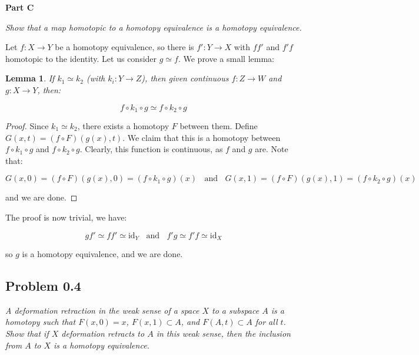 \documentclass[10pt, oneside]{amsart}
\newtheorem{lem}{Lemma}
\begin{document}
    \textbf{Part C}
    \newline

    \textit{Show that a map homotopic to a homotopy equivalence is a homotopy equivalence.}
    \newline

    Let $f : X \rightarrow Y$ be a homotopy equivalence, so there is $f' : Y \rightarrow X$ with $f f'$ and $f' f$ homotopic to the identity. Let us consider $g \simeq f$. We prove a small lemma:

    \begin{lem}
      If $k_1 \simeq k_2$ (with $k_i : Y \rightarrow Z$), then given continuous $f : Z \rightarrow W$ and $g : X \rightarrow Y$, then:

      $$f \circ k_1 \circ g \simeq f \circ k_2 \circ g$$
    \end{lem}

    \begin{proof}
      Since $k_1 \simeq k_2$, there exists a homotopy $F$ between them. Define $G(x, t) = (f \circ F)(g(x), t)$. We claim that this is a homotopy between $f \circ k_1 \circ g$
      and $f \circ k_2 \circ g$. Clearly, this function is continuous, as $f$ and $g$ are. Note that:

      $$G(x, 0) = (f \circ F)(g(x), 0) = (f \circ k_1 \circ g)(x) \ \ \ \ \text{and} \ \ \ \ G(x, 1) = (f \circ F)(g(x), 1) = (f \circ k_2 \circ g)(x)$$

      and we are done.
    \end{proof}

    The proof is now trivial, we have:

    $$g f' \simeq f f' \simeq \text{id}_{Y} \ \ \ \ \text{and} \ \ \ \ f' g \simeq f' f \simeq \text{id}_{X}$$

    so $g$ is a homotopy equivalence, and we are done.

    \hrulefill

    \subsection{Problem 0.4}

    \textit{A deformation retraction in the weak sense of a space $X$ to a subspace $A$ is a homotopy such that $F(x, 0) = x$, $F(x, 1) \subset A$, and $F(A, t) \subset A$ for all $t$. Show that if $X$ deformation retracts to $A$ in this weak sense, then the inclusion from $A$ to $X$
      is a homotopy equivalence.}
    \newline
\end{document}
